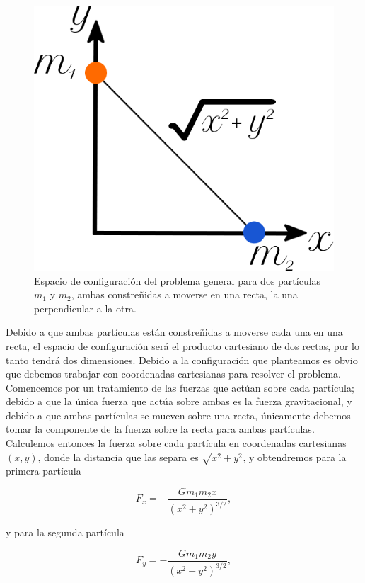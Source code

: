\documentclass[a4paper,10pt]{article}
\numberwithin{equation}{section}
\begin{document}
\begin{figure}[H]
\center
\includegraphics[scale=0.4]{problema1fig1}
\caption{Espacio de configuración del problema general para dos partículas $m_1$ y $m_2$,
ambas constreñidas a moverse en una recta, la una perpendicular a la otra.}
\label{fig:problema1fig1}
\end{figure}

Debido a que ambas partículas están constreñidas a moverse cada una en una recta, 
el espacio de configuración será el producto cartesiano de dos rectas, por lo tanto
tendrá dos dimensiones. Debido a la configuración que planteamos es obvio que debemos
trabajar con coordenadas cartesianas para resolver el problema. Comencemos por un tratamiento
de las fuerzas que actúan sobre cada partícula; debido a que la única fuerza que 
actúa sobre ambas es la fuerza gravitacional, y debido a que ambas partículas se mueven
sobre una recta, únicamente debemos tomar la componente de la fuerza sobre la recta
para ambas partículas. Calculemos entonces la fuerza sobre cada partícula en coordenadas
cartesianas $(x,y)$, donde la distancia que las separa es $\sqrt{x^2+y^2}$, 
y obtendremos para la primera partícula

\begin{equation}
 F_x = - \frac{G m_1 m_2 x}{(x^2+y^2)^{3/2}},
\end{equation}

y para la segunda partícula

\begin{equation}
  F_y = - \frac{G m_1 m_2 y}{(x^2+y^2)^{3/2}},
\end{equation}
\end{document}
